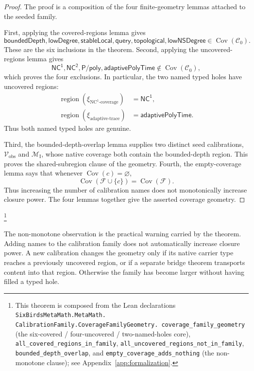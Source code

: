 \documentclass[11pt]{article}
\newcommand{\Cvobs}{\mathcal{V}_{\text{obs}}}
\newcommand{\CMI}{\mathcal{M}_{\text{I}}}
\newcommand{\xiNCone}{\xi_{\text{NC}^{1}\text{-coverage}}}
\newcommand{\xiAdaptive}{\xi_{\text{adaptive-trace}}}
\theoremstyle{definition}
\begin{document}
\begin{proof}
The proof is a composition of the four finite-geometry lemmas attached
to the seeded family.

First, applying the covered-regions lemma gives
\[
  \mathsf{boundedDepth},\mathsf{lowDegree},\mathsf{stableLocal},
  \mathsf{query},\mathsf{topological},\mathsf{lowNSDegree}
  \in \operatorname{Cov}(\mathcal C_0).
\]
These are the six inclusions in the theorem.  Second, applying the
uncovered-regions lemma gives
\[
  \mathsf{NC^1},\mathsf{NC^2},\mathsf{P/poly},
  \mathsf{adaptivePolyTime}
  \notin \operatorname{Cov}(\mathcal C_0),
\]
which proves the four exclusions.  In particular, the two named typed
holes have uncovered regions:
\[
\begin{aligned}
  \operatorname{region}(\xiNCone)&=\mathsf{NC^1},\\
  \operatorname{region}(\xiAdaptive)&=\mathsf{adaptivePolyTime}.
\end{aligned}
\]
Thus both named typed holes are genuine.

Third, the bounded-depth-overlap lemma supplies two distinct seed
calibrations, \(\Cvobs\) and \(\CMI\), whose native coverage both
contain the bounded-depth region.  This proves the shared-subregion
clause of the geometry.  Fourth, the empty-coverage lemma says that
whenever \(\operatorname{Cov}(c)=\varnothing\),
\[
  \operatorname{Cov}(\mathcal F\cup\{c\})
  =
  \operatorname{Cov}(\mathcal F).
\]
Thus increasing the number of calibration names does not monotonically
increase closure power.  The four lemmas together give the asserted
coverage geometry.
\end{proof}\footnote{\raggedright This theorem is composed from the Lean
declarations \texttt{SixBirdsMetaMath.MetaMath.\allowbreak
CalibrationFamily.CoverageFamilyGeometry.\allowbreak
coverage\_family\_geometry} (the six-covered / four-uncovered /
two-named-holes core),
\texttt{all\_covered\_regions\_in\_family},
\texttt{all\_uncovered\_regions\_not\_in\_family},
\texttt{bounded\_depth\_overlap}, and
\texttt{empty\_coverage\_adds\_nothing} (the non-monotone clause);
see Appendix~\ref{app:formalization}.}

The non-monotone observation is the practical warning carried by the
theorem.  Adding names to the calibration family does not automatically
increase closure power.  A new calibration changes the geometry only if
its native carrier type reaches a previously uncovered region, or if a
separate bridge theorem transports content into that region.  Otherwise
the family has become larger without having filled a typed hole.
\end{document}
